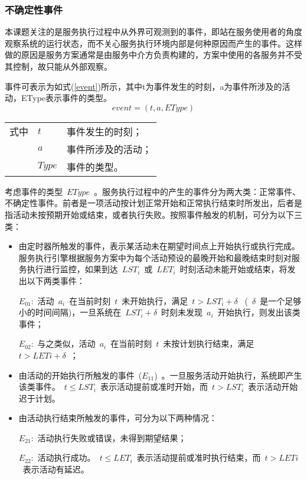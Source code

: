 \subsubsection{不确定性事件}

本课题关注的是服务执行过程中从外界可观测到的事件，即站在服务使用者的角度观察系统的运行状态，而不关心服务执行环境内部是何种原因而产生的事件。这样做的原因是服务方案通常是由服务中介方负责构建的，方案中使用的各服务并不受其控制，故只能从外部观察。

事件可表示为如式(\ref{event})所示，其中t为事件发生的时刻，a为事件所涉及的活动，EType表示事件的类型。
\begin{equation}\label{event}
event = (t, a, EType)
\end{equation}
\begin{tabularx}{\textwidth}{@{}l@{\quad}l@{\pozhehao }X@{}}
    式中
    & $t$ & 事件发生的时刻；\\
    & $a$ & 事件所涉及的活动；\\
    & $Type$ &事件的类型。
\end{tabularx}\vspace{\wordsep}

考虑事件的类型~$EType$~。服务执行过程中的产生的事件分为两大类：正常事件、不确定性事件。前者是一项活动按计划正常开始和正常执行结束时所发出，后者是指活动未按预期开始或结束，或者执行失败。按照事件触发的机制，可分为以下三类：

\begin{itemize}
\item 由定时器所触发的事件，表示某活动未在期望时间点上开始执行或执行完成。服务执行引擎根据服务方案中为每个活动预设的最晚开始和最晚结束时刻对服务执行进行监控，如果到达~$LST_i$~或~$LET_i$~时刻活动未能开始或结束，将发出以下两类事件：

$E_{01}$:~活动~$a_i$~在当前时刻~$t$~未开始执行，满足~$t>LST_i+\delta$~ (~$\delta$~是一个足够小的时间间隔)，一旦系统在~$LST_i+\delta$~时刻未发现~$a_i$~开始执行，则发出该类事件；

$E_{02}$:~与之类似，活动~$a_i$~在当前时刻~$t$~未按计划执行结束，满足~$t>LETi+\delta$~；

\item 由活动的开始执行所触发的事件~($E_{11}$)~。一旦服务活动开始执行，系统即产生该类事件。~$t\le LST_i$~表示活动提前或准时开始，而~$t>LST_i$~表示活动开始迟于计划。

\item 由活动执行结束所触发的事件，可分为以下两种情况：

$E_{21}$:~活动执行失败或错误，未得到期望结果；

$E_{22}$:~活动执行成功。~$t\le LET_i$~表示活动提前或准时执行结束，而~$t>LETi$~表示活动有延迟。

\end{itemize}


